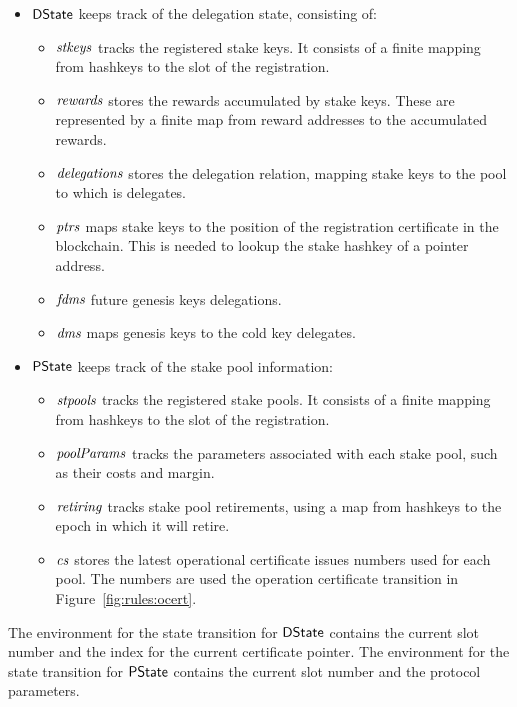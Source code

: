 \begin{itemize}
  \item $\mathsf{DState}$ keeps track of the delegation state, consisting of:
    \begin{itemize}
      \item $\mathit{stkeys}$ tracks the registered stake keys. It consists of a finite
        mapping from hashkeys to the slot of the registration.
      \item $\mathit{rewards}$ stores the rewards accumulated by stake keys.
        These are represented by a finite map from reward addresses to the accumulated rewards.
      \item $\mathit{delegations}$ stores the delegation relation, mapping stake keys to the
        pool to which is delegates.
      \item $\mathit{ptrs}$ maps stake keys to the position of the registration certificate
        in the blockchain. This is needed to lookup the stake hashkey of a pointer address.
      \item $\mathit{fdms}$ future genesis keys delegations.
      \item $\mathit{dms}$ maps genesis keys to the cold key delegates.
    \end{itemize}
  \item $\mathsf{PState}$ keeps track of the stake pool information:
    \begin{itemize}
      \item $\mathit{stpools}$ tracks the registered stake pools. It consists of a finite
        mapping from hashkeys to the slot of the registration.
      \item $\mathit{poolParams}$ tracks the parameters associated with each stake pool, such as
        their costs and margin.
      \item $\mathit{retiring}$ tracks stake pool retirements, using a map from hashkeys to
        the epoch in which it will retire.
      \item $\mathit{cs}$ stores the latest operational certificate issues numbers used for each pool.
        The numbers are used the operation certificate transition in Figure~\ref{fig:rules:ocert}.
    \end{itemize}
\end{itemize}

The environment for the state transition for $\mathsf{DState}$ contains the current slot number
and the index for the current certificate pointer.
The environment for the state transition for $\mathsf{PState}$ contains the current slot number
and the protocol parameters.

